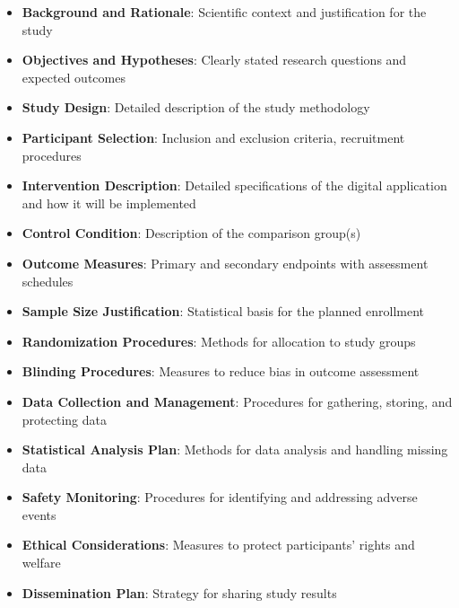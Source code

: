 \begin{itemize}
    \item \textbf{Background and Rationale}: Scientific context and justification for the study
    
    \item \textbf{Objectives and Hypotheses}: Clearly stated research questions and expected outcomes
    
    \item \textbf{Study Design}: Detailed description of the study methodology
    
    \item \textbf{Participant Selection}: Inclusion and exclusion criteria, recruitment procedures
    
    \item \textbf{Intervention Description}: Detailed specifications of the digital application and how it will be implemented
    
    \item \textbf{Control Condition}: Description of the comparison group(s)
    
    \item \textbf{Outcome Measures}: Primary and secondary endpoints with assessment schedules
    
    \item \textbf{Sample Size Justification}: Statistical basis for the planned enrollment
    
    \item \textbf{Randomization Procedures}: Methods for allocation to study groups
    
    \item \textbf{Blinding Procedures}: Measures to reduce bias in outcome assessment
    
    \item \textbf{Data Collection and Management}: Procedures for gathering, storing, and protecting data
    
    \item \textbf{Statistical Analysis Plan}: Methods for data analysis and handling missing data
    
    \item \textbf{Safety Monitoring}: Procedures for identifying and addressing adverse events
    
    \item \textbf{Ethical Considerations}: Measures to protect participants' rights and welfare
    
    \item \textbf{Dissemination Plan}: Strategy for sharing study results
\end{itemize}


